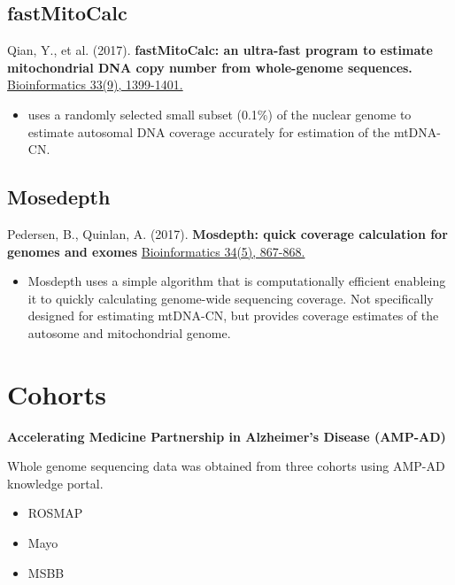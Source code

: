 \documentclass[]{book}
\providecommand{\tightlist}{%
  \setlength{\itemsep}{0pt}\setlength{\parskip}{0pt}}
\begin{document}
\hypertarget{fastmitocalc}{%
\subsection{fastMitoCalc}\label{fastmitocalc}}

Qian, Y., et al. (2017). \textbf{fastMitoCalc: an ultra-fast program to estimate mitochondrial DNA copy number from whole-genome sequences.} \href{https://dx.doi.org/10.1093/bioinformatics/btw835}{Bioinformatics 33(9), 1399-1401.}

\begin{itemize}
\tightlist
\item
  uses a randomly selected small subset (0.1\%) of the nuclear genome to estimate autosomal DNA coverage accurately for estimation of the mtDNA-CN.
\end{itemize}

\hypertarget{mosedepth}{%
\subsection{Mosedepth}\label{mosedepth}}

Pedersen, B., Quinlan, A. (2017). \textbf{Mosdepth: quick coverage calculation for genomes and exomes} \href{https://dx.doi.org/10.1093/bioinformatics/btx699}{Bioinformatics 34(5), 867-868.}

\begin{itemize}
\tightlist
\item
  Mosdepth uses a simple algorithm that is computationally efficient enableing it to quickly calculating genome-wide sequencing coverage. Not specifically designed for estimating mtDNA-CN, but provides coverage estimates of the autosome and mitochondrial genome.
\end{itemize}

\hypertarget{cohorts}{%
\section{Cohorts}\label{cohorts}}

\textbf{Accelerating Medicine Partnership in Alzheimer's Disease (AMP-AD)}

Whole genome sequencing data was obtained from three cohorts using AMP-AD knowledge portal.

\begin{itemize}
\tightlist
\item
  ROSMAP
\item
  Mayo
\item
  MSBB
\end{itemize}
\end{document}
